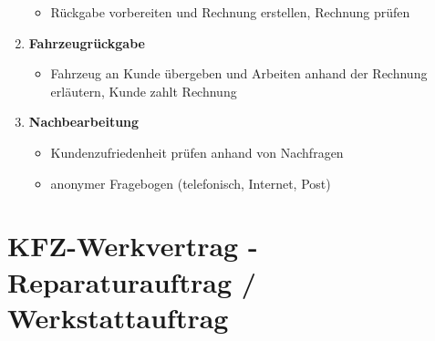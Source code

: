 \begin{enumerate}
  \begin{itemize}
  \item
    Rückgabe vorbereiten und Rechnung erstellen, Rechnung prüfen
  \end{itemize}
\item
  \textbf{Fahrzeugrückgabe}

  \begin{itemize}
  \item
    Fahrzeug an Kunde übergeben und Arbeiten anhand der Rechnung
    erläutern, Kunde zahlt Rechnung
  \end{itemize}
\item
  \textbf{Nachbearbeitung}

  \begin{itemize}
  \item
    Kundenzufriedenheit prüfen anhand von Nachfragen
  \item
    anonymer Fragebogen (telefonisch, Internet, Post)
  \end{itemize}
\end{enumerate}

\newpage

\section{KFZ-Werkvertrag - Reparaturauftrag /
Werkstattauftrag}\label{kfz-werkvertrag-reparaturauftrag-werkstattauftrag}

